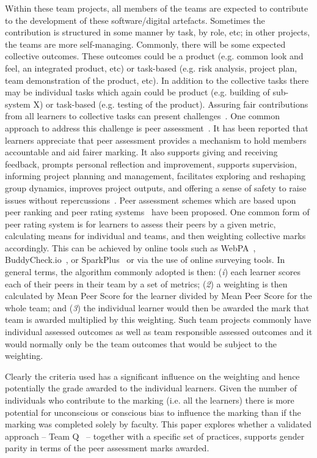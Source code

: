 \documentclass[sigconf, anonymous=false]{acmart}
\begin{document}
Within these team projects, all members of the teams are expected to
contribute to the development of these software/digital
artefacts. Sometimes the contribution is structured in some manner by
task, by role, etc; in other projects, the teams are more
self-managing. Commonly, there will be some expected collective
outcomes. These outcomes could be a product (e.g. common look and
feel, an integrated product, etc) or task-based (e.g. risk analysis,
project plan, team demonstration of the product, etc).  In addition to
the collective tasks there may be individual tasks which again could
be product (e.g. building of sub-system X) or task-based (e.g. testing
of the product). Assuring fair contributions from all learners to
collective tasks can present challenges~\cite{Philips21}. One common
approach to address this challenge is peer
assessment~\cite{Gordon2010}. It has been reported that learners
appreciate that peer assessment provides a mechanism to hold members
accountable and aid fairer marking. It also supports giving and
receiving feedback, prompts personal reflection and improvement,
supports supervision, informing project planning and management,
facilitates exploring and reshaping group dynamics, improves project
outputs, and offering a sense of safety to raise issues without
repercussions~\cite{Mitchell2021}. Peer assessment schemes which are
based upon peer ranking and peer rating systems~\cite{Yanbin2005} have
been proposed. One common form of peer rating system is for learners
to assess their peers by a given metric, calculating means for
individual and teams, and then weighting collective marks
accordingly. This can be achieved by online tools such as
WebPA~\cite{WebPA}, BuddyCheck.io~\cite{BuddyCheck}, or
SparkPlus~\cite{SparkPlus} or via the use of online surveying
tools. In general terms, the algorithm commonly adopted is then:
({\emph{i}}) each learner scores each of their peers in their team by
a set of metrics; ({\emph{2}}) a weighting is then calculated by Mean
Peer Score for the learner divided by Mean Peer Score for the whole
team; and ({\emph{3}}) the individual learner would then be awarded
the mark that team is awarded multiplied by this weighting. Such team
projects commonly have individual assessed outcomes as well as team
responsible assessed outcomes and it would normally only be the team
outcomes that would be subject to the weighting.

Clearly the criteria used has a significant influence on the weighting
and hence potentially the grade awarded to the individual
learners. Given the number of individuals who contribute to the
marking (i.e. all the learners) there is more potential for
unconscious or conscious bias to influence the marking than if the
marking was completed solely by faculty. This paper explores whether a
validated approach -- Team Q~\cite{Britton2017} -- together with a
specific set of practices, supports gender parity in terms of the peer
assessment marks awarded.
\end{document}

